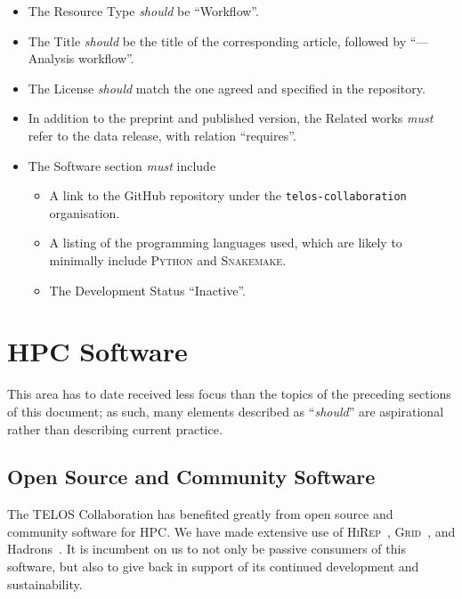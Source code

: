 \documentclass{article}
\newcommand\rfcword[1]{\emph{#1}\xspace}
\newcommand\must{\rfcword{must}}
\newcommand\should{\rfcword{should}}
\newcommand\program[1]{\textsc{#1}\xspace}
\begin{document}
\begin{itemize}
  \item
        The Resource Type \should be ``Workflow''.
  \item
        The Title \should be the title of the corresponding article,
        followed by ``---Analysis workflow''.
  \item
        The License \should match the one agreed and specified in the repository.
  \item
        In addition to the preprint and published version,
        the Related works \must refer to the data release,
        with relation ``requires''.
  \item
        The Software section \must include
        \begin{itemize}
          \item
                A link to the GitHub repository under the \verb|telos-collaboration| organisation.
          \item
                A listing of the programming languages used,
                which are likely to minimally include
                \program{Python} and \program{Snakemake}.
          \item
                The Development Status ``Inactive''.
        \end{itemize}
\end{itemize}


\section{HPC Software}\label{sec:hpc-software}

This area has to date received less focus than
the topics of the preceding sections of this document;
as such,
many elements described as ``\should'' are aspirational
rather than describing current practice.


\subsection{Open Source and Community Software}

The TELOS Collaboration has benefited greatly from open source and community software for HPC\@.
We have made extensive use of \program{HiRep}~\cite{hirep,DelDebbio:2008zf},
\program{Grid}~\cite{grid,Yamaguchi:2022feu},
and Hadrons~\cite{hadrons,antonin_portelli_2023_8023716}.
It is incumbent on us to not only be passive consumers of this software,
but also to give back in support of its continued development and sustainability.
\end{document}
